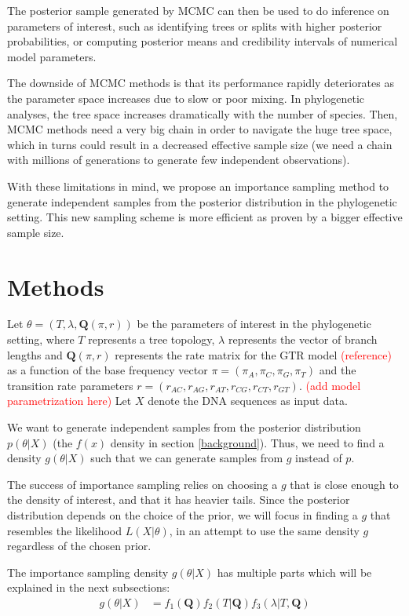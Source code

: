 \documentclass[conference]{IEEEtran}
\newcommand{\falta}[1]{\textcolor{red}{#1}}
\begin{document}
The posterior sample generated by MCMC can then be used to do
inference on parameters of interest, such as identifying trees or
splits with higher posterior probabilities, or computing posterior
means and credibility intervals of numerical model parameters.

The downside of MCMC methods is that its performance rapidly
deteriorates as the parameter space increases due to slow or poor
mixing. In phylogenetic analyses, the tree space increases
dramatically with the number of species. Then, MCMC methods need a
very big chain in order to navigate the huge tree space, which in
turns could result in a decreased effective sample size (we need a
chain with millions of generations to generate few independent
observations).

With these limitations in mind, we propose an importance sampling
method to generate independent samples from the posterior distribution
in the phylogenetic setting. This new sampling scheme is more
efficient as proven by a bigger effective sample size.

\section{Methods}
Let $\theta = (T, \lambda, \mathbf{Q}(\pi,r))$ be the parameters of interest
in the phylogenetic setting, where $T$ represents a tree topology,
$\lambda$ represents the vector of branch lengths and $\mathbf{Q}(\pi,r)$
represents the rate matrix for the GTR model \falta{(reference)} as a
function of the base frequency vector $\pi = (\pi_A, \pi_C, \pi_G,
\pi_T)$ and the transition rate parameters $r = (r_{AC}, r_{AG},
r_{AT}, r_{CG}, r_{CT}, r_{GT})$. \falta{(add model parametrization here)}
Let $X$ denote the DNA sequences as input data.

We want to generate independent samples from the posterior
distribution $p(\theta|X)$ (the $f(x)$ density in section
\ref{background}). Thus, we need to find a density $g(\theta|X)$ such
that we can generate samples from $g$ instead of $p$. 

The success of importance sampling relies on choosing a $g$ that is
close enough to the density of interest, and that it has heavier
tails. Since the posterior distribution depends on the choice of the
prior, we will focus in finding a $g$ that resembles the likelihood
$L(X|\theta)$, in an attempt to use the same density $g$ regardless of
the chosen prior.

The importance sampling density $g(\theta|X)$ has multiple parts which
will be explained in the next subsections:
\begin{align*}
g(\theta|X) &= f_1(\mathbf{Q})f_2(T|\mathbf{Q})f_3(\lambda|T,\mathbf{Q})
\end{align*}
\end{document}
